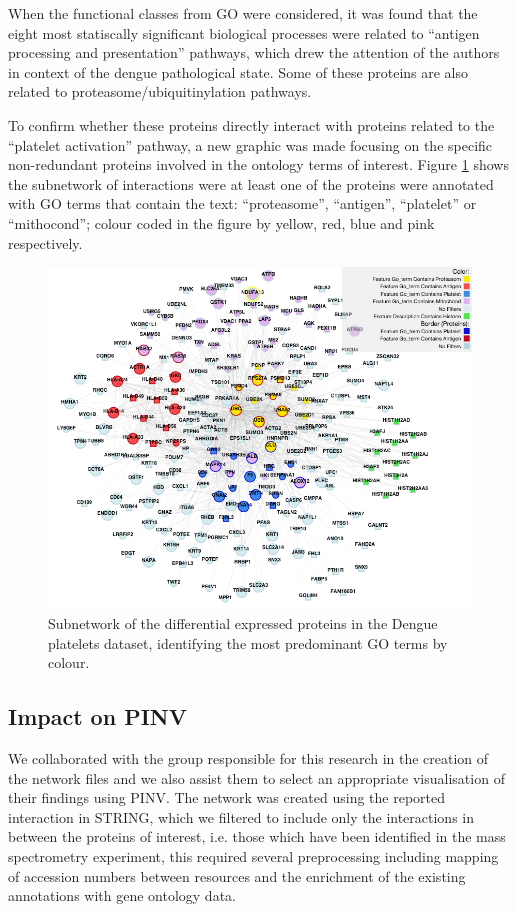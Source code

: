 When the functional classes from GO were considered, it was found that the eight most statiscally significant biological processes were related to “antigen processing and presentation” pathways, which drew the attention of the authors in context of the dengue pathological state. Some of these proteins are also related to proteasome/ubiquitinylation pathways.

To confirm whether these proteins directly interact with proteins related to the ``platelet activation'' pathway, a new graphic was made focusing on the specific non-redundant proteins involved in the ontology terms of interest. Figure \ref{fig:pinv_platelets_2} shows the subnetwork of interactions were at least one of the proteins were annotated with GO terms that contain the text: ``proteasome'', ``antigen'', ``platelet'' or ``mithocond''; colour coded in the figure by yellow, red, blue and pink respectively.

\begin{figure}
\centering
\includegraphics[width=\textwidth]{figures/pinv_platelets_2.png}
\caption[Subnetwork of the differential expressed proteins identifying the most predominant GO terms.]{Subnetwork of the differential expressed proteins in the Dengue platelets dataset, identifying the most predominant GO terms by colour.
\label{fig:pinv_platelets_2}}
\end{figure}

\subsection{Impact on PINV}
We collaborated with the group responsible for this research in the creation of the network files and we also assist them to select an appropriate visualisation of their findings using PINV. The network was created using the reported interaction in STRING, which we filtered to include only the interactions in between the proteins of interest, i.e. those which have been identified in the mass spectrometry experiment, this required several preprocessing including mapping of accession numbers between resources and the enrichment of the existing annotations with gene ontology data.

